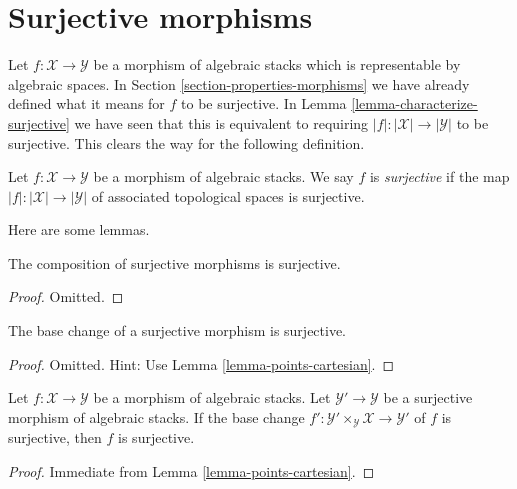 \section{Surjective morphisms}
\label{section-surjective}

\noindent
Let $f : \mathcal{X} \to \mathcal{Y}$ be a morphism of algebraic stacks
which is representable by algebraic spaces. In
Section \ref{section-properties-morphisms}
we have already defined what it means for $f$ to be surjective. In
Lemma \ref{lemma-characterize-surjective}
we have seen that this is equivalent to requiring
$|f| : |\mathcal{X}| \to |\mathcal{Y}|$ to be surjective.
This clears the way for the following definition.

\begin{definition}
\label{definition-surjective}
Let $f : \mathcal{X} \to \mathcal{Y}$ be a morphism of algebraic stacks.
We say $f$ is {\it surjective} if the map
$|f| : |\mathcal{X}| \to |\mathcal{Y}|$ of associated topological spaces
is surjective.
\end{definition}

\noindent
Here are some lemmas.

\begin{lemma}
\label{lemma-composition-surjective}
The composition of surjective morphisms is surjective.
\end{lemma}

\begin{proof}
Omitted.
\end{proof}

\begin{lemma}
\label{lemma-base-change-surjective}
The base change of a surjective morphism is surjective.
\end{lemma}

\begin{proof}
Omitted. Hint: Use
Lemma \ref{lemma-points-cartesian}.
\end{proof}

\begin{lemma}
\label{lemma-descent-surjective}
Let $f : \mathcal{X} \to \mathcal{Y}$ be a morphism of algebraic stacks.
Let $\mathcal{Y}' \to \mathcal{Y}$ be a surjective morphism of algebraic
stacks. If the base change $f' : \mathcal{Y}' \times_\mathcal{Y} \mathcal{X}
\to \mathcal{Y}'$ of $f$ is surjective, then $f$ is surjective.
\end{lemma}

\begin{proof}
Immediate from
Lemma \ref{lemma-points-cartesian}.
\end{proof}

